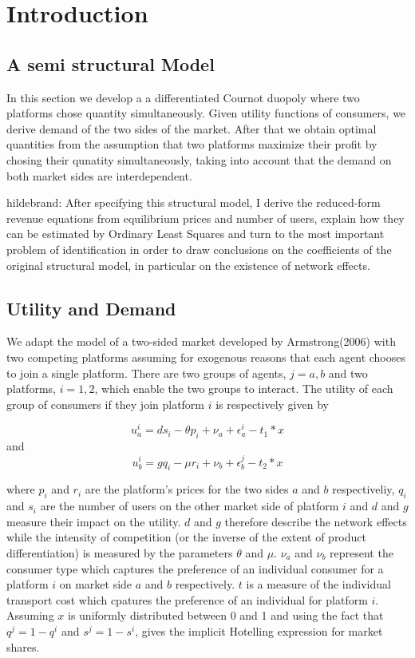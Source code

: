 \documentclass[10pt,a4paper]{article}
\begin{document}
\section{Introduction}


\subsection{A semi structural Model}
In this section we develop a a differentiated Cournot duopoly where two platforms chose quantity simultaneously.
Given utility functions of consumers, we derive demand of the two sides of the market. After that we obtain optimal quantities from the assumption that two platforms maximize their profit by chosing their qunatity simultaneously, taking into account that the demand on both market sides are interdependent. 

hildebrand: After specifying this structural model, I derive the reduced-form revenue equations from equilibrium prices and number of users, explain how they can be estimated by Ordinary Least Squares and turn to the most important problem of identification in order to draw conclusions on the coefficients of the original structural model, in particular on the existence of network effects.

\subsection{Utility and Demand}
We adapt the model of a two-sided market developed by Armstrong(2006) with two competing platforms assuming for exogenous reasons that each agent chooses to join a single platform. There are two groups of agents, $j= a, b$ and two platforms, $ i = 1,2$, which enable the two groups to interact. The utility of each group of consumers if they join platform $i$ is respectively given by 

$$ u^i_a = ds_i-\theta p_i+\nu_a+\epsilon^i_a-t_1*x$$ and $$ u^i_b = gq_i-\mu r_i+\nu_b+\epsilon^j_b-t_2*x$$

where $p_i$ and $r_i$ are the platform's prices for the two sides $a$ and $b$ respectiveliy, $q_i$ and $s_i$ are the number of users on the other market side of platform $i$ and $d$ and $g$ measure their impact on the utility. $d$ and $g$ therefore describe the network effects while the intensity of competition (or the inverse of the extent of product differentiation) is measured by the parameters $\theta$ and $\mu$. $\nu_a$ and $\nu_b$ represent the consumer type which captures the preference of an individual consumer for a platform $i$ on market side $a$ and $b$ respectively. $t$ is a measure of the individual transport cost which cpatures the preference of an individual for platform $i$. Assuming $x$ is uniformly distributed between 0 and 1 and using the fact that $q^j=1-q^i$ and $s^j=1-s^i$, gives the implicit Hotelling expression for market shares. 
\end{document}

